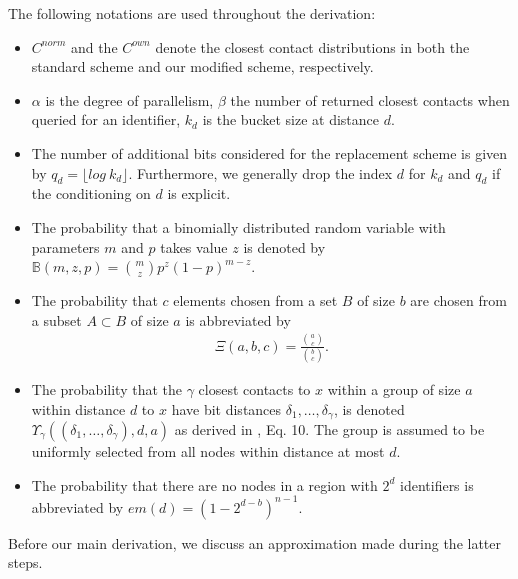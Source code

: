 \documentclass[10pt, conference, compsocconf, letterpaper]{IEEEtran}
\renewcommand{\binom}{\mathbb{B}}
\renewcommand{\over}{\Xi}
\newcommand{\best}{\Upsilon}
\begin{document}
\vspace{3pt}
The following notations are used throughout the derivation: 
\begin{itemize}
\item $C^{norm}$ and the $C^{own}$ denote the closest contact distributions in both the standard scheme and our modified scheme, respectively.
\item $\alpha$ is the degree of parallelism, $\beta$ the number of returned closest contacts when queried
for an identifier, $k_d$ is the bucket size at distance $d$.
\item The number of additional bits considered for the replacement scheme is given by 
$q_d=\lfloor log~k_d \rfloor$. Furthermore, we generally drop the index $d$ for $k_d$ and $q_d$ if the conditioning on $d$ is explicit.
\item The probability that a binomially distributed random variable with parameters $m$ and
$p$ takes value $z$ is denoted by $\binom(m,z,p)= {m \choose z}p^z(1-p)^{m-z}$.
\item The probability that $c$ elements chosen from a set $B$ of size $b$ are chosen from a subset
$A\subset B$ of size $a$ is abbreviated by 
\begin{align*}
\over(a,b,c)=\frac{{a \choose c}}{{b \choose c}}.
\end{align*}
\item The probability that the $\gamma$ closest
contacts to $x$ within a group of size $a$ within distance $d$ to $x$ 
have bit distances $\delta_1, \ldots , \delta_\gamma$, is denoted $\best_\gamma((\delta_1, \ldots , \delta_\gamma),d,a)$ as derived in \cite{roos13comprehending},
Eq. 10. The group is assumed
to be uniformly selected from all nodes within distance at most $d$. 
\item  The probability that there are no nodes in a region with $2^d$ identifiers
is abbreviated by $em(d) = \left(1-2^{d-b}\right)^{n-1}$.
\end{itemize}
Before our main derivation, we discuss an approximation made during the latter steps.
\end{document}
